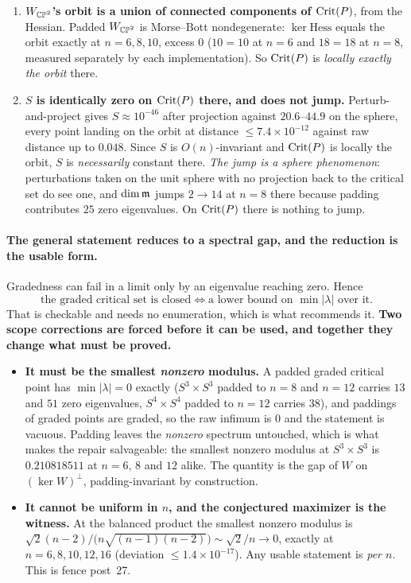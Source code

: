 \begin{enumerate}[leftmargin=1.8em,nosep]
\item \textbf{$W_{\mathbb{CP}^2}$'s orbit is a union of connected components of $\mathrm{Crit}(P)$}, from the Hessian. Padded $W_{\mathbb{CP}^2}$ is Morse--Bott nondegenerate: $\ker\mathrm{Hess}$ equals the orbit exactly at $n=6,8,10$, excess $0$ ($10=10$ at $n=6$ and $18=18$ at $n=8$, measured separately by each implementation). So $\mathrm{Crit}(P)$ is \emph{locally exactly the orbit} there.
\item \textbf{$S$ is identically zero on $\mathrm{Crit}(P)$ there, and does not jump.} Perturb-and-project gives $S\approx10^{-46}$ after projection against $20.6$--$44.9$ on the sphere, every point landing on the orbit at distance $\le7.4\times10^{-12}$ against raw distance up to $0.048$. Since $S$ is $O(n)$-invariant and $\mathrm{Crit}(P)$ is locally the orbit, $S$ is \emph{necessarily} constant there. \emph{The jump is a sphere phenomenon}: perturbations taken on the unit sphere with no projection back to the critical set do see one, and $\dim\mathfrak{m}$ jumps $2\to14$ at $n=8$ there because padding contributes $25$ zero eigenvalues. On $\mathrm{Crit}(P)$ there is nothing to jump.
\end{enumerate}

\paragraph{The general statement reduces to a spectral gap, and the reduction is the usable form.} Gradedness can fail in a limit only by an eigenvalue reaching zero. Hence
\[
\text{the graded critical set is closed}
\iff
\text{a lower bound on }\min|\lambda|\text{ over it.}
\]
That is checkable and needs no enumeration, which is what recommends it. \textbf{Two scope corrections are forced before it can be used, and together they change what must be proved.}

\begin{itemize}[leftmargin=1.5em,nosep]
\item \textbf{It must be the smallest \emph{nonzero} modulus.} A padded graded critical point has $\min|\lambda|=0$ exactly ($S^3\times S^3$ padded to $n=8$ and $n=12$ carries $13$ and $51$ zero eigenvalues, $S^4\times S^4$ padded to $n=12$ carries $38$), and paddings of graded points are graded, so the raw infimum is $0$ and the statement is vacuous. Padding leaves the \emph{nonzero} spectrum untouched, which is what makes the repair salvageable: the smallest nonzero modulus at $S^3\times S^3$ is $0.210818511$ at $n=6$, $8$ and $12$ alike. The quantity is the gap of $W$ on $(\ker W)^{\perp}$, padding-invariant by construction.
\item \textbf{It cannot be uniform in $n$, and the conjectured maximizer is the witness.} At the balanced product the smallest nonzero modulus is $\sqrt2(n-2)/\big(n\sqrt{(n-1)(n-2)}\big)\sim\sqrt2/n\to0$, exactly at $n=6,8,10,12,16$ (deviation $\le1.4\times10^{-17}$). Any usable statement is \emph{per $n$}. This is fence post~27.
\end{itemize}

